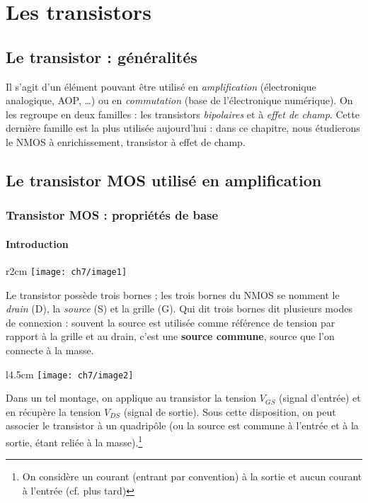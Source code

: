 \chapter{Les transistors}
\section{Le transistor : généralités}
Il s'agit d'un élément pouvant être utilisé en \textit{amplification} (électronique 
analogique, AOP, \dots) ou en \textit{commutation} (base de l'électronique numérique). 
On les regroupe en deux familles : les transistors \textit{bipolaires} et à 
\textit{effet de champ}. Cette dernière famille est la plus utilisée aujourd'hui : 
dans ce chapitre, nous étudierons le NMOS à enrichissement, transistor à effet de champ.

\section{Le transistor MOS utilisé en amplification}
	\subsection{Transistor MOS : propriétés de base}
		\subsubsection{Introduction}
				\begin{wrapfigure}[6]{r}{2cm}
		\vspace{-1cm}
		\texttt{[image: ch7/image1]}
		\end{wrapfigure}
	Le transistor possède trois bornes ; les trois bornes du NMOS se nomment le 
	\textit{drain} (D), la \textit{source} (S) et la grille (G). Qui dit trois bornes 
	dit plusieurs modes de connexion : souvent la source est utilisée comme référence 
	de tension par rapport à la grille et au drain, c'est une \textbf{source commune}, 
	source que l'on connecte à la masse.\\

		\begin{wrapfigure}[5]{l}{4.5cm}
	\vspace{-0.5cm}
	\texttt{[image: ch7/image2]}
		\end{wrapfigure}	
	Dans un tel montage, on applique au transistor la tension $V_{GS}$ (signal d'entrée) 
	et en récupère la tension $V_{DS}$ (signal de sortie). Sous cette disposition, on 
	peut associer le transistor à un quadripôle (ou la source est commune à l'entrée et 
	à la sortie, étant reliée à la masse).\footnote{On considère un courant (entrant par 
	convention) à la sortie et aucun courant à l'entrée (cf. plus tard)}
	
